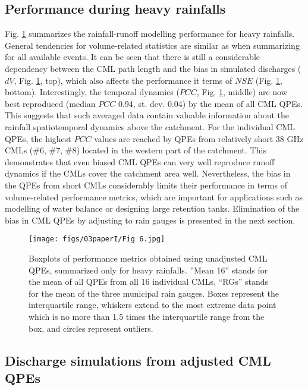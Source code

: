 \documentclass{ctuthesis}\usepackage[]{graphicx}\usepackage[]{color}
\begin{document}
\subsection{Performance during heavy rainfalls}

Fig. \ref{3fig6} summarizes the rainfall-runoff modelling performance for heavy rainfalls. General tendencies for volume-related statistics are similar as when summarizing for all available events. It can be seen that there is still a considerable dependency between the CML path length and the bias in simulated discharges ($dV$, Fig. \ref{3fig6}, top), which also affects the performance it terms of $NSE$ (Fig. \ref{3fig6}, bottom). Interestingly, the temporal dynamics ($PCC$, Fig. \ref{3fig6}, middle) are now best reproduced (median $PCC$ 0.94, st. dev. 0.04) by the mean of all CML QPEs. This suggests that such averaged data contain valuable information about the rainfall spatiotemporal dynamics above the catchment. For the individual CML QPEs, the highest $PCC$ values are reached by QPEs from relatively short 38 GHz CMLs (\#6, \#7, \#8) located in the western part of the catchment. This demonstrates that even biased CML QPEs can very well reproduce runoff dynamics if the CMLs cover the catchment area well. Nevertheless, the bias in the QPEs from short CMLs considerably limits their performance in terms of volume-related performance metrics, which are important for applications such as modelling of water balance or designing large retention tanks. Elimination of the bias in CML QPEs by adjusting to rain gauges is presented in the next section.

\begin{figure}[h]
\begin{center}
\texttt{[image: figs/03paperI/Fig 6.jpg]}
\caption{Boxplots of performance metrics obtained using unadjusted CML QPEs, summarized only for heavy rainfalls. ”Mean 16” stands for the mean of all QPEs from all 16 individual CMLs, “RGs” stands for the mean of the three municipal rain gauges. Boxes represent the interquartile range, whiskers extend to the most extreme data point which is no more than 1.5 times the interquartile range from the box, and circles represent outliers.} \label{3fig6}
\end{center}
\end{figure}


\subsection{Discharge simulations from adjusted CML QPEs}
\end{document}
